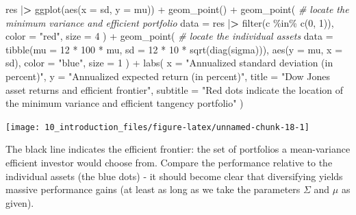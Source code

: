 \documentclass[
]{krantz}
\newenvironment{Shaded}{\begin{snugshade}}{\end{snugshade}}
\newcommand{\AttributeTok}[1]{\textcolor[rgb]{0.61,0.61,0.61}{#1}}
\newcommand{\CommentTok}[1]{\textcolor[rgb]{0.37,0.37,0.37}{\textit{#1}}}
\newcommand{\DecValTok}[1]{\textcolor[rgb]{0.06,0.06,0.06}{#1}}
\newcommand{\ErrorTok}[1]{\textcolor[rgb]{0.14,0.14,0.14}{\textbf{#1}}}
\newcommand{\FunctionTok}[1]{\textcolor[rgb]{0,0,0}{#1}}
\newcommand{\NormalTok}[1]{#1}
\newcommand{\SpecialCharTok}[1]{\textcolor[rgb]{0,0,0}{#1}}
\newcommand{\StringTok}[1]{\textcolor[rgb]{0.5,0.5,0.5}{#1}}
\begin{document}
\begin{Shaded}
\begin{Highlighting}[]
\NormalTok{res }\SpecialCharTok{|}\ErrorTok{\textgreater{}}
  \FunctionTok{ggplot}\NormalTok{(}\FunctionTok{aes}\NormalTok{(}\AttributeTok{x =}\NormalTok{ sd, }\AttributeTok{y =}\NormalTok{ mu)) }\SpecialCharTok{+}
  \FunctionTok{geom\_point}\NormalTok{() }\SpecialCharTok{+}
  \FunctionTok{geom\_point}\NormalTok{( }\CommentTok{\# locate the minimum variance and efficient portfolio}
    \AttributeTok{data =}\NormalTok{ res }\SpecialCharTok{|}\ErrorTok{\textgreater{}} \FunctionTok{filter}\NormalTok{(c }\SpecialCharTok{\%in\%} \FunctionTok{c}\NormalTok{(}\DecValTok{0}\NormalTok{, }\DecValTok{1}\NormalTok{)),}
    \AttributeTok{color =} \StringTok{"red"}\NormalTok{,}
    \AttributeTok{size =} \DecValTok{4}
\NormalTok{  ) }\SpecialCharTok{+}
  \FunctionTok{geom\_point}\NormalTok{( }\CommentTok{\# locate the individual assets}
    \AttributeTok{data =} \FunctionTok{tibble}\NormalTok{(}\AttributeTok{mu =} \DecValTok{12} \SpecialCharTok{*} \DecValTok{100} \SpecialCharTok{*}\NormalTok{ mu, }\AttributeTok{sd =} \DecValTok{12} \SpecialCharTok{*} \DecValTok{10} \SpecialCharTok{*} \FunctionTok{sqrt}\NormalTok{(}\FunctionTok{diag}\NormalTok{(sigma))),}
    \FunctionTok{aes}\NormalTok{(}\AttributeTok{y =}\NormalTok{ mu, }\AttributeTok{x =}\NormalTok{ sd), }\AttributeTok{color =} \StringTok{"blue"}\NormalTok{, }\AttributeTok{size =} \DecValTok{1}
\NormalTok{  ) }\SpecialCharTok{+}
  \FunctionTok{labs}\NormalTok{(}
    \AttributeTok{x =} \StringTok{"Annualized standard deviation (in percent)"}\NormalTok{,}
    \AttributeTok{y =} \StringTok{"Annualized expected return (in percent)"}\NormalTok{,}
    \AttributeTok{title =} \StringTok{"Dow Jones asset returns and efficient frontier"}\NormalTok{,}
    \AttributeTok{subtitle =} \StringTok{"Red dots indicate the location of the minimum variance and efficient tangency portfolio"}
\NormalTok{  )}
\end{Highlighting}
\end{Shaded}

\begin{center}\texttt{[image: 10\_introduction\_files/figure-latex/unnamed-chunk-18-1]} \end{center}

The black line indicates the efficient frontier: the set of portfolios a mean-variance efficient investor would choose from. Compare the performance relative to the individual assets (the blue dots) - it should become clear that diversifying yields massive performance gains (at least as long as we take the parameters \(\Sigma\) and \(\mu\) as given).
\end{document}
